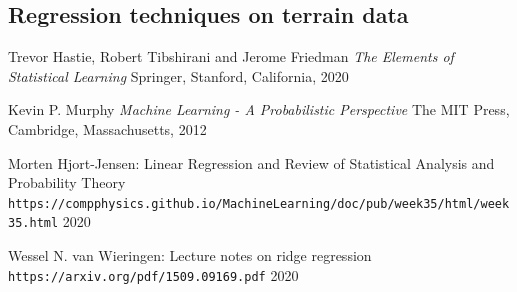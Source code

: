 \documentclass{article}
\begin{document}
\subsection{Regression techniques on terrain data}

\medskip

\begin{thebibliography}{3}
Trevor Hastie, Robert Tibshirani and Jerome Friedman
\textit{The Elements of Statistical Learning}
Springer, Stanford, California, 2020

Kevin P. Murphy
\textit{Machine Learning - A Probabilistic Perspective}
The MIT Press, Cambridge, Massachusetts, 2012

Morten Hjort-Jensen: Linear Regression and Review of Statistical Analysis and Probability Theory 
\\\texttt{https://compphysics.github.io/MachineLearning/doc/pub/week35/html/week35.html}
2020

Wessel N. van Wieringen: Lecture notes on ridge regression
\\\texttt{https://arxiv.org/pdf/1509.09169.pdf}
2020

\end{thebibliography}
\end{document}
